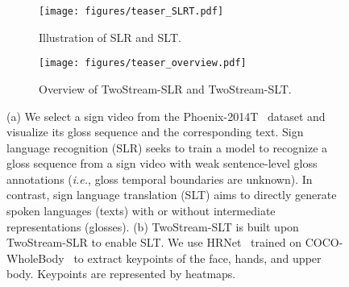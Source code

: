 \documentclass{article}
\def\ie{\emph{i.e.}} \def\Ie{\emph{I.e.}}
\begin{document}
\begin{figure}[t]
     \begin{subfigure}{.44\textwidth}
         \centering
         \texttt{[image: figures/teaser\_SLRT.pdf]}
         \caption{Illustration of SLR and SLT.}
         \label{fig:teaser_SLRT}
     \end{subfigure}
\hfill
\begin{subfigure}{.52\textwidth}
  \centering
  \texttt{[image: figures/teaser\_overview.pdf]}
  \caption{Overview of TwoStream-SLR and TwoStream-SLT.}
  \label{fig:teaser_overview}
\end{subfigure}
\caption{(a) We select a sign video from the Phoenix-2014T~\cite{camgoz2018neural} dataset and visualize its gloss sequence and the corresponding text. Sign language recognition (SLR) seeks to train a model to recognize a gloss sequence from a sign video with weak sentence-level gloss annotations (\ie, gloss temporal boundaries are unknown). In contrast, sign language translation (SLT) aims to directly generate spoken languages (texts) with or without intermediate representations (glosses). (b) TwoStream-SLT is built upon TwoStream-SLR to enable SLT. We use HRNet~\cite{wang2020deep} trained on COCO-WholeBody~\cite{jin2020whole} to extract keypoints of the face, hands, and upper body. Keypoints are represented by heatmaps.}
\label{fig:fig}
\end{figure}
\end{document}
